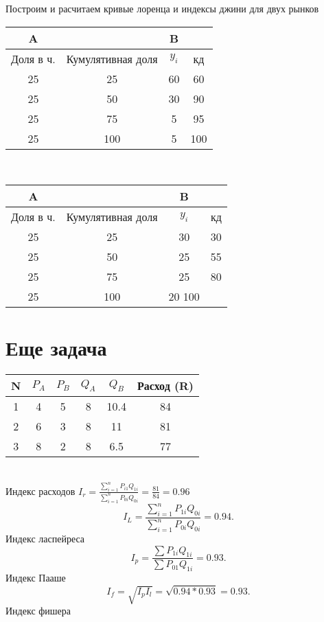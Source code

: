 \documentclass[14pt]{extarticle}
\begin{document}
Построим и расчитаем кривые лоренца и индексы джини для двух рынков\\
\begin{tabular}{|c|c|c|c|}
    A & & B &\\
    \hline
    Доля в ч.& Кумулятивная доля & $y_{i}$ & кд \\
    25 & 25 & 60 & 60 \\
    \hline
    25 & 50 & 30 & 90 \\
    \hline
    25 & 75 & 5 & 95 \\
    \hline
    25 & 100 & 5 & 100\\
    \hline
\end{tabular}\\
\begin{tabular}{|c|c|c|c|}
    A & & B &\\
    \hline
    Доля в ч.& Кумулятивная доля & $y_{i}$ & кд \\
    25 & 25 & 30 & 30 \\
    \hline
    25 & 50 & 25 & 55 \\
    \hline 
    25 & 75 & 25 & 80 \\
    \hline
    25 & 100 & 20 100\\
    \hline
\end{tabular}
\section{Еще задача}
\begin{tabular}{|c|c|c|c|c|c|}
    \hline
    N & $P_{A}$ & $P_{B}$ & $Q_{A}$ & $Q_{B}$ & Расход (R)\\
    \hline
    1 & 4 & 5 & 8 & 10.4 & 84 \\
    \hline
    2 & 6 & 3 & 8 & 11 & 81\\
    \hline
    3 & 8 & 2 & 8 & 6.5 &77 \\
    \hline
\end{tabular}\\
Индекс расходов $I_{r} = \frac{\sum_{i = 1}^{n} P_{i1} Q_{1i}}{\sum_{i=1}^{n} P_{0i} Q_{0i}} = \frac{81}{84} = 0.96$
\[
I_{L} = \frac{\sum_{i = 1}^{n} P_{1i} Q_{0i}}{\sum_{i = 1}^{n}P_{0i}Q_{0i}} = 0.94
.\] 
Индекс ласпейреса
\[
    I_{p}=\frac{\sum P_{1i} Q_{1i}}{\sum P_{01} Q_{1i}} = 0.93
.\] 
Индекс Пааше
\[
I_{f} = \sqrt{I_{p}  I_{l}}  = \sqrt{0.94 * 0.93}  = 0.93
.\] 
Индекс фишера
\end{document}
